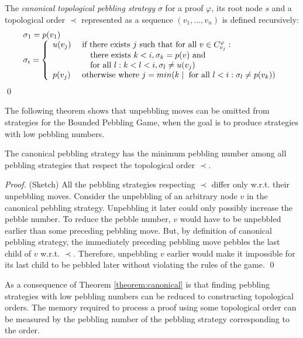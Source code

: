 \begin{definition}
The \emph{canonical topological pebbling strategy} $\sigma$ for a proof $\varphi$, its root node $s$ and a topological order $\prec$ represented as a sequence $(v_1,\dots,v_n)$ is defined recursively:
$$
\begin{array}{l}
\sigma_1 = p(v_1) \\
\sigma_i = 
	\left\{
	\begin{array}{ll}
		u(v_j) & \text{ if there exists $j$ such that for all }v \in C_{v_j}^{\varphi}: \\
		       & \quad \text{ there exists }k < i, \sigma_k = p(v) \text{ and }\\
					 & \quad \text{ for all } l: k < l < i, \sigma_l \neq u(v_j) \\
		p(v_j) & \text{ otherwise where } j = min(k \mid \text{ for all }l < i: \sigma_l \neq p(v_k))
	\end{array}
	\right.
\end{array}
$$
\qed
\end{definition}

The following theorem shows that unpebbling moves can be omitted from strategies for the Bounded Pebbling Game, when the goal is to produce strategies with low pebbling numbers.

\begin{theorem}
\label{theorem:canonical}
The canonical pebbling strategy has the minimum pebbling number among all pebbling strategies that respect the topological order $\prec$.
\end{theorem}
\begin{proof} (Sketch)
All the pebbling strategies respecting $\prec$ differ only w.r.t. their unpebbling moves.
Consider the unpebbling of an arbitrary node $v$ in the canonical pebbling strategy. Unpebbling it later could only possibly increase the pebble number. To reduce the pebble number, $v$ would have to be unpebbled earlier than some preceding pebbling move. But, by definition of canonical pebbling strategy, the immediately preceding pebbling move pebbles the last child of $v$ w.r.t. $\prec$. Therefore, unpebbling $v$ earlier would make it impossible for its last child to be pebbled later without violating the rules of the game.
\qed
\end{proof}

As a consequence of Theorem \ref{theorem:canonical} is that finding pebbling strategies with low pebbling numbers can be reduced to constructing topological orders.
The memory required to process a proof using some topological order can be measured by the pebbling number of the pebbling strategy corresponding to the order.

